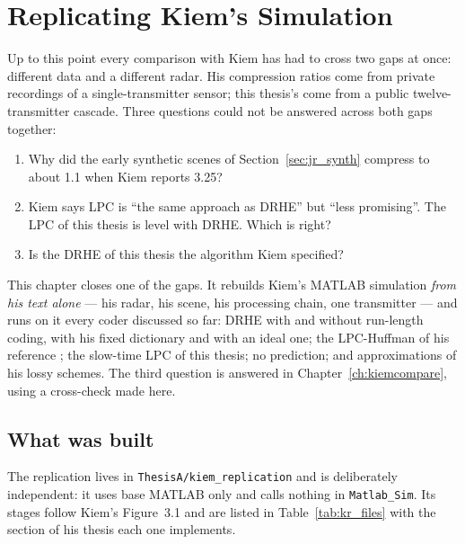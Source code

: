 \chapter{Replicating Kiem's Simulation}
\label{ch:replication}

Up to this point every comparison with Kiem has had to cross two gaps at once:
different data and a different radar. His compression ratios come from private
recordings of a single-transmitter sensor; this thesis's come from a public
twelve-transmitter cascade. Three questions could not be answered across both
gaps together:

\begin{enumerate}
\item Why did the early synthetic scenes of Section~\ref{sec:jr_synth} compress
to about 1.1 when Kiem reports 3.25?
\item Kiem says LPC is ``the same approach as DRHE'' but ``less promising''.
The LPC of this thesis is level with DRHE. Which is right?
\item Is the DRHE of this thesis the algorithm Kiem specified?
\end{enumerate}

\noindent
This chapter closes one of the gaps. It rebuilds Kiem's MATLAB simulation
\emph{from his text alone} --- his radar, his scene, his processing chain, one
transmitter --- and runs on it every coder discussed so far: DRHE with and
without run-length coding, with his fixed dictionary and with an ideal one; the
LPC-Huffman of his reference \cite{meucci2022}; the slow-time LPC of this thesis; no
prediction; and approximations of his lossy schemes. The third question is
answered in Chapter~\ref{ch:kiemcompare}, using a cross-check made here.

\section{What was built}
\label{sec:kr_built}

The replication lives in \texttt{ThesisA/kiem\_replication} and is
deliberately independent: it uses base MATLAB only and calls nothing in
\texttt{Matlab\_Sim}. Its stages follow Kiem's Figure~3.1 and are listed in
Table~\ref{tab:kr_files} with the section of his thesis each one implements.

